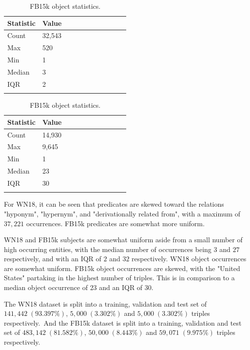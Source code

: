 \begin{table}[H]
	\parbox{.5\linewidth}{
		\centering
		\begin{tabular}{lllllllllll}
  			\textbf{Statistic} & \textbf{Value}  \\
  			\hline
			Count & 32,543 \\
			Max & 520 \\
			Min & 1 \\
  			Median & 3 \\
  			IQR & 2 \\
			&
		\end{tabular}
		\caption{WN18 object statistics.}
		}
	\hfill
	\parbox{.5\linewidth}{
		\centering
		\begin{tabular}{lllllllllll}
  			\textbf{Statistic} & \textbf{Value}  \\
  			\hline
			Count & 14,930 \\
			Max & 9,645 \\
			Min & 1 \\
  			Median & 23 \\
  			IQR & 30 \\
			&
		\end{tabular}
		\caption{FB15k object statistics.}
		}
\end{table}

\noindent For WN18, it can be seen that predicates are skewed toward the relations "hyponym",  "hypernym", and "derivationally related from", with a maximum of $ 37, 221 $ occurrences. FB15k predicates are somewhat more uniform. \par

\noindent WN18 and FB15k subjects are somewhat uniform aside from a small number of high occurring entities, with the median number of occurrences being $ 3 $ and $ 27 $ respectively, and with an IQR of $ 2 $ and $ 32 $ respectively. WN18 object occurrences are somewhat uniform. FB15k object occurrences are skewed, with the "United States" partaking in the highest number of triples. This is in comparison to a median object occurrence of $ 23 $ and an IQR of 30. \par

\noindent The WN18 dataset is split into a training, validation and test set of $ 141, 442 \; (93.397 \%) $, $ 5, 000 \; (3.302 \%) $ and $ 5, 000 \; (3.302 \%) $ triples respectively.\ And the FB15k dataset is split into a training, validation and test set of $ 483, 142 \; (81.582 \%) $, $ 50, 000 \; (8.443 \%) $ and $ 59, 071 \; (9.975 \%) $ triples respectively. 


